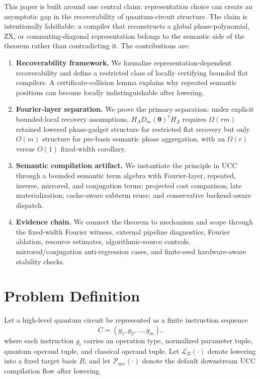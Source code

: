 \documentclass[11pt]{article}
\begin{document}
This paper is built around one central claim: representation choice can create
an asymptotic gap in the recoverability of quantum-circuit structure. The claim
is intentionally falsifiable: a compiler that reconstructs a global
phase-polynomial, ZX, or commuting-diagonal representation belongs to the
semantic side of the theorem rather than contradicting it. The contributions
are:

\begin{enumerate}[leftmargin=1.5em]
    \item \textbf{Recoverability framework.} We formalize representation-dependent recoverability and define a restricted class of locally certifying bounded flat compilers. A certificate-collision lemma explains why repeated semantic positions can become locally indistinguishable after lowering.
    \item \textbf{Fourier-layer separation.} We prove the primary separation: under explicit bounded-local recovery assumptions, $H_{\Lambda}D_m(\boldsymbol{\theta})^rH_{\Lambda}$ requires $\Omega(rm)$ retained lowered phase-gadget structure for restricted flat recovery but only $O(m)$ structure for pre-basis semantic phase aggregation, with an $\Omega(r)$ versus $O(1)$ fixed-width corollary.
    \item \textbf{Semantic compilation artifact.} We instantiate the principle in UCC through a bounded semantic term algebra with Fourier-layer, repeated, inverse, mirrored, and conjugation terms; projected cost comparison; late materialization; cache-aware subterm reuse; and conservative backend-aware dispatch.
    \item \textbf{Evidence chain.} We connect the theorem to mechanism and scope through the fixed-width Fourier witness, external pipeline diagnostics, Fourier ablation, resource estimates, algorithmic-source controls, mirrored/conjugation anti-regression cases, and finite-seed hardware-aware stability checks.
\end{enumerate}

\section{Problem Definition}
\label{sec:problem}

Let a high-level quantum circuit be represented as a finite instruction sequence
\[
C = (g_1, g_2, \dots, g_m),
\]
where each instruction $g_i$ carries an operation type, normalized parameter tuple, quantum operand tuple, and classical operand tuple. Let $\mathcal{L}_B(\cdot)$ denote lowering into a fixed target basis $B$, and let $\mathcal{P}_{\mathrm{ucc}}(\cdot)$ denote the default downstream UCC compilation flow after lowering.
\end{document}
